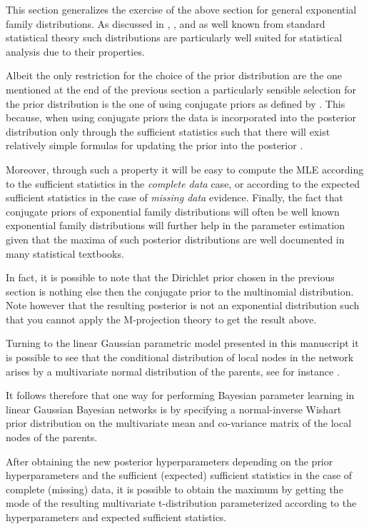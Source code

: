 \documentclass[11pt]{article}
\begin{document}
\begin{article}
This section generalizes the exercise of the above section for
general exponential family distributions. As discussed in
\cite{barndorff1978hyperbolic}, \cite{geiger1998asymptotic},
\cite{lauritzen1996graphical} and as well known from standard
statistical theory such distributions are particularly well suited
for statistical analysis due to their properties. 

Albeit the only restriction for the choice of the prior
distribution are the one mentioned at the end of the previous
section a particularly sensible selection for the prior
distribution is the one of using conjugate priors as defined by
\cite{schlaifer1961applied}. This because, when using conjugate
priors the data is incorporated into the posterior distribution
only through the sufficient statistics such that there will exist
relatively simple formulas for updating the prior into the
posterior \cite{fink1997compendium}.

Moreover, through such a property it will be easy to compute the
MLE according to the sufficient statistics in the \emph{complete data}
case, or according to the expected sufficient statistics in the
case of \emph{missing data} evidence. Finally, the fact that conjugate
priors of exponential family distributions will often be well
known exponential family distributions will further help in the
parameter estimation given that the maxima of such posterior
distributions are well documented in many statistical textbooks.

In fact, it is possible to note that the Dirichlet prior chosen in
the previous section is nothing else then the conjugate prior to
the multinomial distribution. Note however that the resulting
posterior is not an exponential distribution such that you cannot
apply the M-projection theory to get the result above.

Turning to the linear Gaussian parametric model presented in this
manuscript it is possible to see that the conditional distribution
of local nodes in the network arises by a multivariate normal
distribution of the parents, see for instance
\cite{koller2009probabilistic}.

It follows therefore that one way for performing Bayesian parameter
learning in linear Gaussian Bayesian networks is by specifying a
normal-inverse Wishart prior distribution on the multivariate mean
and co-variance matrix of the local nodes of the parents.

After obtaining the new posterior hyperparameters depending on the
prior hyperparameters and the sufficient (expected) sufficient
statistics in the case of complete (missing) data, it is possible
to obtain the maximum by getting the mode of the resulting
multivariate t-distribution parameterized according to the
hyperparameters and expected sufficient statistics.


\end{article}
\end{document}
